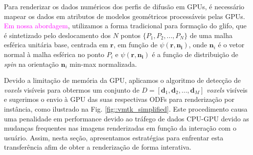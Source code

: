 Para renderizar os dados numéricos dos perfis de difusão em GPUs, é necessário mapear os dados em atributos de modelos geométricos processáveis pelas GPUs. \textcolor{magenta}{Em nossa abordagem}, utilizamos a forma tradicional para formação do glifo, que é sintetizado pelo deslocamento dos $N$ pontos  $\{
P_1,
P_2, ...,
P_N
\}$
de uma malha esférica unitária base, centrada em $\mathbf{r}$, em função de $\psi (\mathbf{r, \mathbf{n}_i})$, onde $\mathbf{n}_i$ é o vetor normal à malha esférica no ponto $P_i$ e $\psi (\mathbf{r, \mathbf{n}_i})$ é a função de distribuição de \textit{spin} na orientação $\mathbf{n}_i$ min-max normalizada.




Devido a limitação de memória da GPU,  aplicamos o algoritmo de detecção de \textit{voxels} visíveis \cite{voltoline2021} para obtermos um conjunto de $D = [
\mathbf{d}_1,
\mathbf{d}_2, ..., 
\mathbf{d}_M
]$ \textit{voxels} visíveis e sugerimos o envio à GPU das suas respectivas ODFs para renderização por instância, como ilustrado na Fig. \ref{fig::vmtk_simplified}. Este procedimento causa uma penalidade em performance devido ao tráfego de dados CPU-GPU devido as mudanças frequentes nas imagens renderizadas em função da interação com o usuário. Assim, nesta seção, apresentamos estratégias para enfrentar esta transferência afim de obter a renderização de forma interativa.


